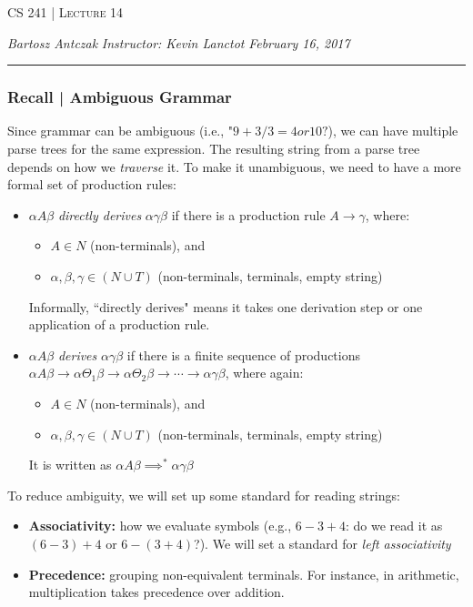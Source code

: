 \documentclass{report}
\newcommand{\lectureNum}{14}
\newcommand{\curDate}{February 16, 2017}
\newcommand{\course}{CS 241}
\newcommand{\instructor}{Kevin Lanctot}
\begin{document}
\begin{center}
\begin{Large}
\textsc{\course{} | Lecture \lectureNum{}}
\end{Large}
\end{center} 
\noindent \textit{Bartosz Antczak} \hfill
\textit{Instructor: \instructor{}} \hfill
\textit{\curDate{}}
\rule{\textwidth}{0.4pt}
\subsubsection{Recall | Ambiguous Grammar}
Since grammar can be ambiguous (i.e., "$9 + 3 / 3 = 4 or 10?$), we can have multiple parse trees for the same expression. The resulting string from a parse tree depends on how we \textit{traverse} it. To make it unambiguous, we need to have a more formal set of production rules:
\begin{itemize}
\item $\alpha A \beta$ \textit{directly derives} $\alpha \gamma \beta$ if there is a production rule $A \rightarrow \gamma$, where:
\begin{itemize}
\item $A \in N$ (non-terminals), and
\item $\alpha, \beta, \gamma \in (N \cup T)$ (non-terminals, terminals, empty string)
\end{itemize}
Informally, ``directly derives" means it takes one derivation step or one application of a production rule.
\item $\alpha A \beta$ \textit{derives} $\alpha \gamma \beta$ if there is a finite sequence of productions $\alpha A \beta \rightarrow \alpha \Theta_1 \beta \rightarrow \alpha \Theta_2 \beta \rightarrow \cdots \rightarrow \alpha \gamma \beta$, where again:
\begin{itemize}
\item $A \in N$ (non-terminals), and
\item $\alpha, \beta, \gamma \in (N \cup T)$ (non-terminals, terminals, empty string)
\end{itemize}
It is written as $\alpha A \beta \implies^* \alpha \gamma \beta$
\end{itemize}
To reduce ambiguity, we will set up some standard for reading strings:
\begin{itemize}
\item \textbf{Associativity:} how we evaluate symbols (e.g., $6 - 3 + 4$: do we read it as $(6-3)+4$ or $6 - (3+4)$?). We will set a standard for \textit{left associativity}
\item \textbf{Precedence:} grouping non-equivalent terminals. For instance, in arithmetic, multiplication takes precedence over addition.
\end{itemize}
\end{document}
